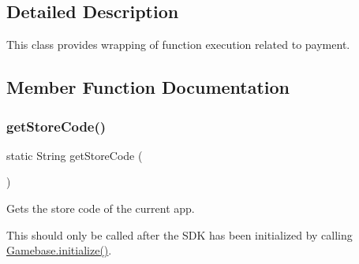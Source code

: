 \subsection{Detailed Description}
This class provides wrapping of function execution related to payment. 

\subsection{Member Function Documentation}
\mbox{\label{classcom_1_1toast_1_1android_1_1gamebase_1_1_gamebase_1_1_purchase_ae6a7d3ccf1e7de6fb479485cce1ddeea}} 
\subsubsection{\texorpdfstring{get\+Store\+Code()}{getStoreCode()}}
{\footnotesize\ttfamily static String get\+Store\+Code (\begin{DoxyParamCaption}{ }\end{DoxyParamCaption})\hspace{0.3cm}{\ttfamily [static]}}



Gets the store code of the current app. 

This should only be called after the S\+DK has been initialized by calling \hyperlink{classcom_1_1toast_1_1android_1_1gamebase_1_1_gamebase_a1b2d26183c219ab1ef840a95af71bd88}{Gamebase.\+initialize()}.

